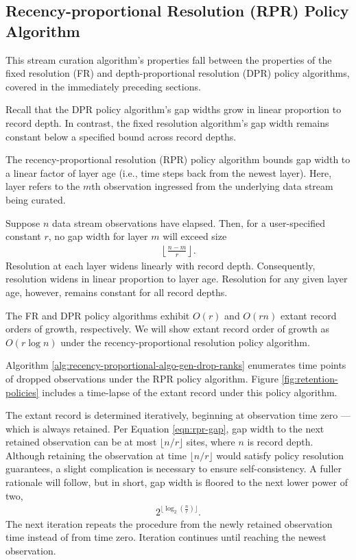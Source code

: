 \subsection{Recency-proportional Resolution (RPR) Policy Algorithm}
\label{sec:recency-proportional-resolution-algo}

This stream curation algorithm's properties fall between the properties of the fixed resolution (FR) and depth-proportional resolution (DPR) policy algorithms, covered in the immediately preceding sections.

Recall that the DPR policy algorithm's gap widths grow in linear proportion to record depth.
In contrast, the fixed resolution algorithm's gap width remains constant below a specified bound across record depths.

The recency-proportional resolution (RPR) policy algorithm bounds gap width to a linear factor of layer age (i.e., time steps back from the newest layer).
Here, layer refers to the $m$th observation ingressed from the underlying data stream being curated.

Suppose $n$ data stream observations have elapsed.
Then, for a user-specified constant $r$, no gap width for layer $m$ will exceed size
\begin{align}
  \left\lfloor \frac{n - m}{r} \right\rfloor.
  \label{eqn:rpr-gap}
\end{align}
Resolution at each layer widens linearly with record depth.
Consequently, resolution widens in linear proportion to layer age.
Resolution for any given layer age, however, remains constant for all record depths.

The FR and DPR policy algorithms exhibit $O(r)$ and $O(rn)$ extant record orders of growth, respectively.
We will show extant record order of growth as $O(r\log{n})$ under the recency-proportional resolution policy algorithm.

Algorithm \ref{alg:recency-proportional-algo-gen-drop-ranks} enumerates time points of dropped observations under the RPR policy algorithm.
Figure \ref{fig:retention-policies} includes a time-lapse of the extant record under this policy algorithm.

The extant record is determined iteratively, beginning at observation time zero --- which is always retained.
Per Equation \ref{eqn:rpr-gap}, gap width to the next retained observation can be at most $\lfloor n/r \rfloor$ sites, where $n$ is record depth.
Although retaining the observation at time $\lfloor n/r \rfloor$ would satisfy policy resolution guarantees, a slight complication is necessary to ensure self-consistency.
A fuller rationale will follow, but in short, gap width is floored to the next lower power of two,
\begin{align*}
  2^{\lfloor \log_{2}\left(\frac{n}{r}\right) \rfloor}.
\end{align*}
The next iteration repeats the procedure from the newly retained observation time instead of from time zero.
Iteration continues until reaching the newest observation.

